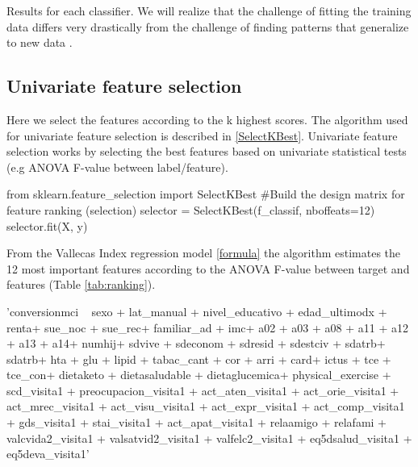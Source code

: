 \documentclass[11pt]{article}
\begin{document}
Results for each classifier. We will realize that the challenge of fitting the training data differs very drastically from the challenge of finding patterns that generalize to new data \cite{goodfellow2016deep}.

\subsection{Univariate feature selection}
\label{se:reslinreg}

Here we select the features according to the k highest scores. The algorithm used for univariate feature selection is described in \ref{SelectKBest}. Univariate feature selection works by selecting the best features based on univariate statistical tests (e.g ANOVA F-value between label/feature).

\begin{code}[caption=SelectKBest, label=SelectKBest]
from sklearn.feature_selection import SelectKBest
#Build the design matrix for feature ranking (selection)
selector = SelectKBest(f_classif, nboffeats=12)
selector.fit(X, y)
\end{code}

From the Vallecas Index regression model \ref{formula} the algorithm estimates the 12 most important features according to the ANOVA F-value between target and features (Table \ref{tab:ranking}).

\begin{code}[caption=Regression formula, label=formula]
'conversionmci ~ sexo + lat_manual + nivel_educativo  + edad_ultimodx + renta+ sue_noc + sue_rec+ familiar_ad + imc+ a02 + a03 + a08 + a11 + a12 + a13 + a14+ numhij+ sdvive + sdeconom + sdresid + sdestciv + sdatrb+ sdatrb+ hta + glu + lipid + tabac_cant + cor + arri + card+ ictus + tce + tce_con+ dietaketo + dietasaludable + dietaglucemica+ physical_exercise + scd_visita1 + preocupacion_visita1 + act_aten_visita1 + act_orie_visita1 + act_mrec_visita1 + act_visu_visita1 + act_expr_visita1 + act_comp_visita1 + gds_visita1 + stai_visita1 + act_apat_visita1 + relaamigo + relafami + valcvida2_visita1 + valsatvid2_visita1 + valfelc2_visita1 + eq5dsalud_visita1 + eq5deva_visita1'
\end{code}
\end{document}
